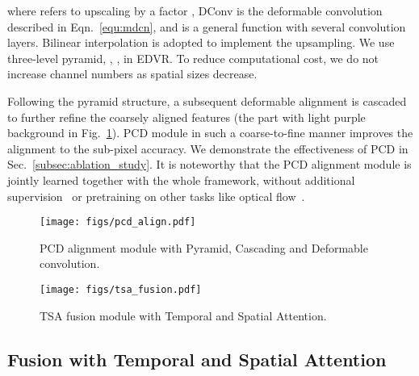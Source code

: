 \documentclass[10pt,twocolumn,letterpaper]{article}
\begin{document}
\vspace{-0.5cm}

where  refers to upscaling by a factor , DConv is the deformable convolution described in Eqn.~\ref{equ:mdcn}, and  is a general function with several convolution layers. Bilinear interpolation is adopted to implement the  upsampling. We use three-level pyramid, \ie, , in EDVR. To reduce computational cost, we do not increase channel numbers as spatial sizes decrease.

Following the pyramid structure, a subsequent deformable alignment is cascaded to further refine the coarsely aligned features (the part with light purple background in Fig.~\ref{fig:pcd_align}). 
PCD module in such a coarse-to-fine manner improves the alignment to the sub-pixel accuracy. We demonstrate the effectiveness of PCD in Sec.~\ref{subsec:ablation_study}.
It is noteworthy that the PCD alignment module is jointly learned together with the whole framework, without additional supervision~\cite{tian2018tdan} or pretraining on other tasks like optical flow~\cite{xue2017video}. 

\begin{figure}[!t]
	\vspace{-0.5cm}
	\begin{center}
		\texttt{[image: figs/pcd\_align.pdf]}
		\vspace{-0.3cm}
		\caption{PCD alignment module with Pyramid, Cascading and Deformable convolution.}
		\label{fig:pcd_align}
		\vspace{-0.6cm}
	\end{center}
\end{figure}

\begin{figure}[t]
	\vspace{-0.5cm}
	\begin{center}
		\texttt{[image: figs/tsa\_fusion.pdf]}
		\vspace{-0.3cm}
		\caption{TSA fusion module with Temporal and Spatial Attention.}
		\label{fig:tsa_fusion}
		\vspace{-0.7cm}
	\end{center}
\end{figure}

\subsection{Fusion with Temporal and Spatial Attention}
\label{subsec:tsa}
\end{document}
